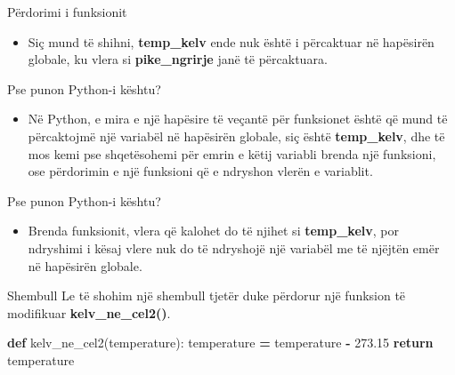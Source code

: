 \documentclass[
  ignorenonframetext,
]{beamer}
\newenvironment{Shaded}{\begin{snugshade}}{\end{snugshade}}
\newcommand{\ControlFlowTok}[1]{\textcolor[rgb]{0.13,0.29,0.53}{\textbf{#1}}}
\newcommand{\FloatTok}[1]{\textcolor[rgb]{0.00,0.00,0.81}{#1}}
\newcommand{\KeywordTok}[1]{\textcolor[rgb]{0.13,0.29,0.53}{\textbf{#1}}}
\newcommand{\NormalTok}[1]{#1}
\newcommand{\OperatorTok}[1]{\textcolor[rgb]{0.81,0.36,0.00}{\textbf{#1}}}
\providecommand{\tightlist}{%
  \setlength{\itemsep}{0pt}\setlength{\parskip}{0pt}}
\begin{document}
\begin{frame}{Përdorimi i funksionit}
\protect\hypertarget{puxebrdorimi-i-funksionit-1}{}
\begin{itemize}
\tightlist
\item
  Siç mund të shihni, \textbf{temp\_kelv} ende nuk është i përcaktuar në
  hapësirën globale, ku vlera si \textbf{pike\_ngrirje} janë të
  përcaktuara.
\end{itemize}
\end{frame}

\begin{frame}{Pse punon Python-i kështu?}
\protect\hypertarget{pse-punon-python-i-kuxebshtu}{}
\begin{itemize}
\tightlist
\item
  Në Python, e mira e një hapësire të veçantë për funksionet është që
  mund të përcaktojmë një variabël në hapësirën globale, siç është
  \textbf{temp\_kelv}, dhe të mos kemi pse shqetësohemi për emrin e
  këtij variabli brenda një funksioni, ose përdorimin e një funksioni që
  e ndryshon vlerën e variablit.
\end{itemize}
\end{frame}

\begin{frame}{Pse punon Python-i kështu?}
\protect\hypertarget{pse-punon-python-i-kuxebshtu-1}{}
\begin{itemize}
\tightlist
\item
  Brenda funksionit, vlera që kalohet do të njihet si
  \textbf{temp\_kelv}, por ndryshimi i kësaj vlere nuk do të ndryshojë
  një variabël me të njëjtën emër në hapësirën globale.
\end{itemize}
\end{frame}

\begin{frame}[fragile]{Shembull}
\protect\hypertarget{shembull-1}{}
Le të shohim një shembull tjetër duke përdorur një funksion të
modifikuar \textbf{kelv\_ne\_cel2()}.

\begin{Shaded}
\begin{Highlighting}[]
\KeywordTok{def}\NormalTok{ kelv\_ne\_cel2(temperature):}
\NormalTok{    temperature }\OperatorTok{=}\NormalTok{ temperature }\OperatorTok{{-}} \FloatTok{273.15}
    \ControlFlowTok{return}\NormalTok{ temperature}
\end{Highlighting}
\end{Shaded}
\end{frame}
\end{document}
